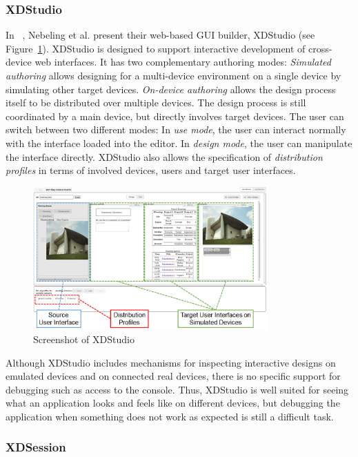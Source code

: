 \subsubsection{XDStudio}

In ~\cite{xdstudio2014}, Nebeling et al. present their web-based GUI builder, XDStudio (see Figure~\ref{fig:xdstudio}). XDStudio is designed to support interactive development of cross-device web interfaces. It has two complementary authoring modes: \emph{Simulated authoring} allows designing for a multi-device environment on a single device by simulating other target devices. \emph{On-device authoring} allows the design process itself to be distributed over multiple devices. The design process is still coordinated by a main device, but directly involves target devices. The user can switch between two different modes: In \emph{use mode}, the user can interact normally with the interface loaded into the editor. In \emph{design mode}, the user can manipulate the interface directly. XDStudio also allows the specification of \emph{distribution profiles} in terms of involved devices, users and target user interfaces.

\begin{figure}[H]
  \centering
    \includegraphics[width=0.8\textwidth]{images/relatedwork/xdstudio.png}
	\caption[Screenshot: XDStudio]{Screenshot of XDStudio}
	\label{fig:xdstudio}
\end{figure}

Although XDStudio includes mechanisms for inspecting interactive designs on emulated devices and on connected real devices, there is no specific support for debugging such as access to the console. Thus, XDStudio is well suited for seeing what an application looks and feels like on different devices, but debugging the application when something does not work as expected is still a difficult task.

\subsubsection{XDSession}

